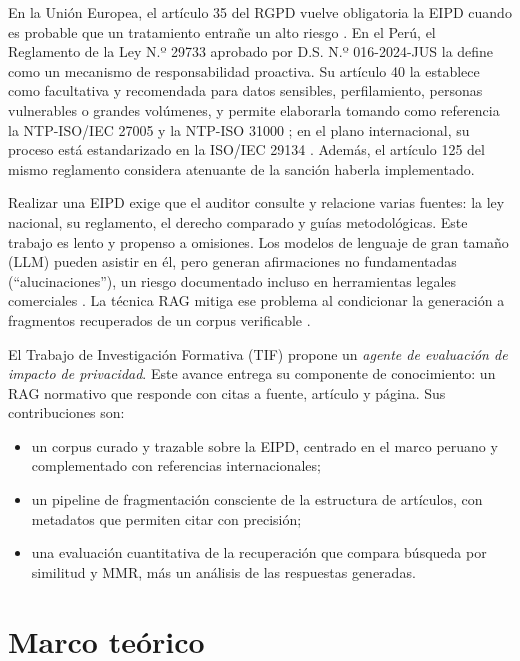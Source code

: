 \documentclass[conference]{IEEEtran}
\begin{document}
En la Unión Europea, el artículo 35 del RGPD vuelve obligatoria la EIPD cuando es probable que un tratamiento entrañe un alto riesgo \cite{rgpd2016}. En el Perú, el Reglamento de la Ley N.º 29733 aprobado por D.S. N.º 016-2024-JUS la define como un mecanismo de responsabilidad proactiva. Su artículo 40 la establece como facultativa y recomendada para datos sensibles, perfilamiento, personas vulnerables o grandes volúmenes, y permite elaborarla tomando como referencia la NTP-ISO/IEC 27005 y la NTP-ISO 31000 \cite{ds0162024}; en el plano internacional, su proceso está estandarizado en la ISO/IEC 29134 \cite{iso29134}. Además, el artículo 125 del mismo reglamento considera atenuante de la sanción haberla implementado.

Realizar una EIPD exige que el auditor consulte y relacione varias fuentes: la ley nacional, su reglamento, el derecho comparado y guías metodológicas. Este trabajo es lento y propenso a omisiones. Los modelos de lenguaje de gran tamaño (LLM) pueden asistir en él, pero generan afirmaciones no fundamentadas (``alucinaciones''), un riesgo documentado incluso en herramientas legales comerciales \cite{magesh2024hallucination}. La técnica RAG mitiga ese problema al condicionar la generación a fragmentos recuperados de un corpus verificable \cite{lewis2020rag,gao2023survey}.

El Trabajo de Investigación Formativa (TIF) propone un \emph{agente de evaluación de impacto de privacidad}. Este avance entrega su componente de conocimiento: un RAG normativo que responde con citas a fuente, artículo y página. Sus contribuciones son:
\begin{itemize}
  \item un corpus curado y trazable sobre la EIPD, centrado en el marco peruano y complementado con referencias internacionales;
  \item un pipeline de fragmentación consciente de la estructura de artículos, con metadatos que permiten citar con precisión;
  \item una evaluación cuantitativa de la recuperación que compara búsqueda por similitud y MMR, más un análisis de las respuestas generadas.
\end{itemize}

\section{Marco teórico}
\end{document}
